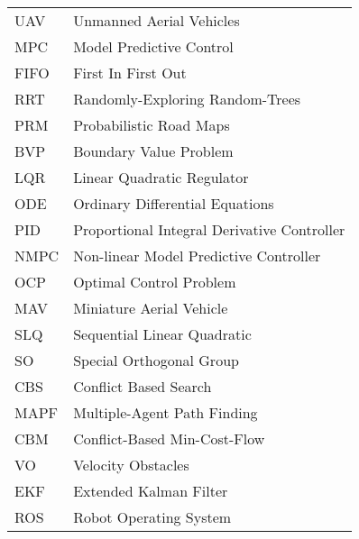 \begin{table}[h!]
\begin{tabular}{ll}
UAV&Unmanned Aerial Vehicles\\
MPC& Model Predictive Control \\
FIFO & First In First Out\\
RRT & Randomly-Exploring Random-Trees \\
PRM & Probabilistic Road Maps\\
BVP & Boundary Value Problem \\
LQR & Linear Quadratic Regulator \\
ODE & Ordinary Differential Equations \\
PID & Proportional Integral Derivative Controller\\
NMPC & Non-linear Model Predictive Controller \\
OCP & Optimal Control Problem \\
MAV & Miniature Aerial Vehicle\\
SLQ & Sequential Linear Quadratic \\
SO & Special Orthogonal Group \\
CBS & Conflict Based Search \\
MAPF & Multiple-Agent Path Finding \\
CBM & Conflict-Based Min-Cost-Flow\\
VO & Velocity Obstacles\\
EKF & Extended Kalman Filter \\
ROS & Robot Operating System
\end{tabular}
\end{table}